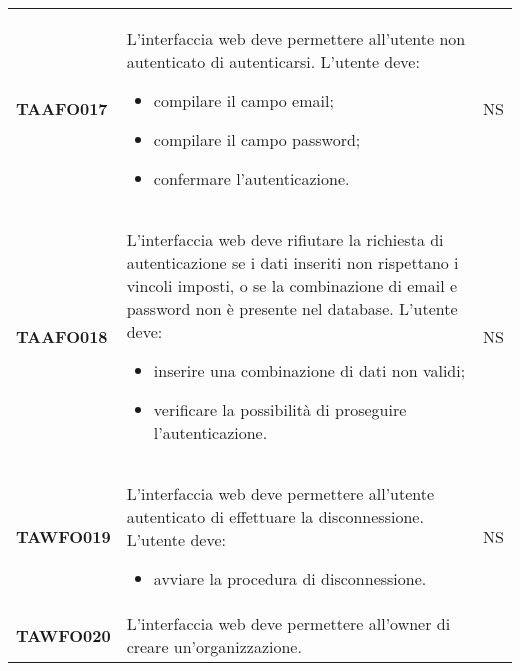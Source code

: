 \documentclass[../piano-di-qualifica.tex]{subfiles}
\begin{document}
\begin{longtable}[H]{>{\centering\bfseries}m{3cm} >{}m{11cm} >{\centering\arraybackslash}m{2cm}}
  TAAFO017                        & L’interfaccia web deve permettere all’utente non autenticato di autenticarsi. \newline
  L’utente deve:
  \begin{itemize}
    \item compilare il campo email;
    \item compilare il campo password;
    \item confermare l'autenticazione.
  \end{itemize}
                                  & NS                                                                                                                                                                                                                                   \\
  TAAFO018                        & L’interfaccia web deve rifiutare la richiesta di autenticazione se i dati inseriti non rispettano i vincoli imposti, o se la combinazione di email e password non è presente nel database. \newline
  L’utente deve:
  \begin{itemize}
    \item inserire una combinazione di dati non validi;
    \item verificare la possibilità di proseguire l'autenticazione.
  \end{itemize}
                                  & NS                                                                                                                                                                                                                                   \\
  TAWFO019                        & L’interfaccia web deve permettere all’utente autenticato di effettuare la disconnessione. \newline
  L’utente deve:
  \begin{itemize}
    \item avviare la procedura di disconnessione.
  \end{itemize}
                                  & NS                                                                                                                                                                                                                                   \\
  TAWFO020                        & L’interfaccia web deve permettere all’owner di creare un’organizzazione. \newline

\end{longtable}
\end{document}
